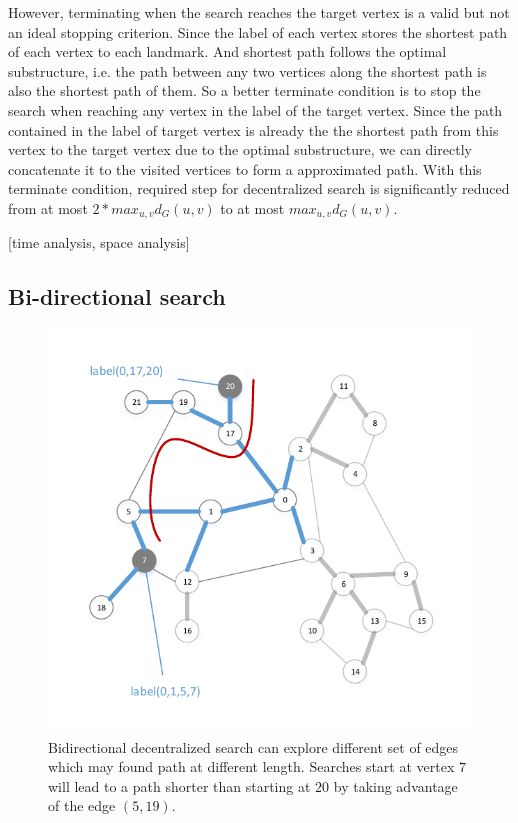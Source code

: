 However, terminating when the search reaches the target vertex is a valid but not an ideal stopping criterion. Since the label of each vertex stores the shortest path of each vertex to each landmark. And shortest path follows the optimal substructure, i.e. the path between any two vertices along the shortest path is also the shortest path of them. So a better terminate condition is to stop the search when reaching any vertex in the label of the target vertex. Since the path contained in the label of target vertex is already the the shortest path from this vertex to the target vertex due to the optimal substructure, we can directly concatenate it to the visited vertices to form a approximated path. With this terminate condition, required step for decentralized search is significantly reduced from at most $2 * max_{u,v}d_G(u,v)$ to at most $max_{u,v}d_G(u,v)$. 


[time analysis, space analysis]

\subsection{Bi-directional search}

\begin{figure}[t]
    \centering
    \includegraphics[width=\linewidth]{./figures/new_illustrate/bi_dec.pdf}
    \caption{Bidirectional decentralized search can explore different set of edges which may found path at different length. Searches start at vertex $7$ will lead to a path shorter than starting at $20$ by taking advantage of the edge $(5, 19)$.}
    \label{fig:bi_dec}
\end{figure}

